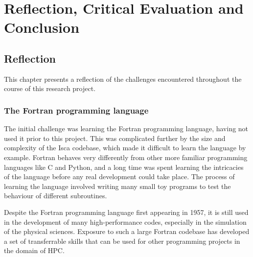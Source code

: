 \documentclass[a4paper,11pt]{report}
\begin{document}

\part{Reflection, Critical Evaluation and Conclusion}


\chapter{Reflection}
This chapter presents a reflection of the challenges encountered throughout the course of this research project. 

\section{The Fortran programming language}
The initial challenge was learning the Fortran programming language, having not used it prior to this project. This was complicated further by the size and complexity of the Isca codebase, which made it difficult to learn the language by example. Fortran behaves very differently from other more familiar programming languages like C and Python, and a long time was spent learning the intricacies of the language before any real development could take place. The process of learning the language involved writing many small toy programs to test the behaviour of different subroutines. 
\par
Despite the Fortran programming language first appearing in 1957, it is still used in the development of many high-performance codes, especially in the simulation of the physical sciences. Exposure to such a large Fortran codebase has developed a set of transferrable skills that can be used for other programming projects in the domain of HPC. 

%
%
%

\end{document}
